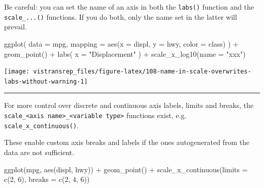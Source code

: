 \documentclass[]{book}
\newenvironment{Shaded}{}{}
\newcommand{\DataTypeTok}[1]{#1}
\newcommand{\DecValTok}[1]{#1}
\newcommand{\KeywordTok}[1]{\textcolor[rgb]{0.00,0.00,1.00}{#1}}
\newcommand{\NormalTok}[1]{#1}
\newcommand{\OperatorTok}[1]{#1}
\newcommand{\StringTok}[1]{\textcolor[rgb]{0.00,0.50,0.50}{#1}}
\begin{document}
Be careful: you can set the name of an axis in both the \texttt{labs()} function and the \texttt{scale\_...()} functions.
If you do both, only the name set in the latter will prevail.

\begin{Shaded}
\begin{Highlighting}[]
\KeywordTok{ggplot}\NormalTok{(}
  \DataTypeTok{data =}\NormalTok{ mpg,}
  \DataTypeTok{mapping =} \KeywordTok{aes}\NormalTok{(}\DataTypeTok{x =}\NormalTok{ displ, }\DataTypeTok{y =}\NormalTok{ hwy, }\DataTypeTok{color =}\NormalTok{ class)}
\NormalTok{) }\OperatorTok{+}
\StringTok{  }\KeywordTok{geom_point}\NormalTok{() }\OperatorTok{+}
\StringTok{  }\KeywordTok{labs}\NormalTok{(}
    \DataTypeTok{x =} \StringTok{"Displacement"}
\NormalTok{  ) }\OperatorTok{+}
\StringTok{  }\KeywordTok{scale_x_log10}\NormalTok{(}\DataTypeTok{name =} \StringTok{"xxx"}\NormalTok{)}
\end{Highlighting}
\end{Shaded}

\begin{flushright}\texttt{[image: vistransrep\_files/figure-latex/108-name-in-scale-overwrites-labs-without-warning-1]} \end{flushright}

\begin{center}\rule{0.5\linewidth}{\linethickness}\end{center}

For more control over discrete and continuous axis labels, limits and breaks, the \texttt{scale\_\textless{}axis\ name\textgreater{}\_\textless{}variable\ type\textgreater{}} functions exist, e.g. \texttt{scale\_x\_continuous()}.

These enable custom axis breaks and labels if the ones autogenerated from the data are not sufficient.

\begin{Shaded}
\begin{Highlighting}[]
\KeywordTok{ggplot}\NormalTok{(mpg, }\KeywordTok{aes}\NormalTok{(displ, hwy)) }\OperatorTok{+}
\StringTok{  }\KeywordTok{geom_point}\NormalTok{() }\OperatorTok{+}
\StringTok{  }\KeywordTok{scale_x_continuous}\NormalTok{(}\DataTypeTok{limits =} \KeywordTok{c}\NormalTok{(}\DecValTok{2}\NormalTok{, }\DecValTok{6}\NormalTok{), }\DataTypeTok{breaks =} \KeywordTok{c}\NormalTok{(}\DecValTok{2}\NormalTok{, }\DecValTok{4}\NormalTok{, }\DecValTok{6}\NormalTok{))}
\end{Highlighting}
\end{Shaded}
\end{document}
